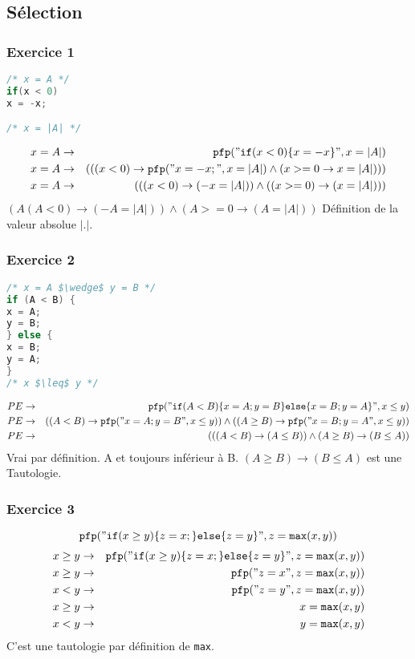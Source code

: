 \subsection{Sélection} \label{exoPfpSelect}
\subsubsection{Exercice 1}
\begin{lstlisting}[language=C]
/* x = A */
if(x < 0)
x = -x;

/* x = |A| */
\end{lstlisting}

\begin{eqnarray*}
x = A &\rightarrow& \texttt{pfp} ("\texttt{if}(x < 0)\{ x = -x \}", x = |A|)\\
x = A &\rightarrow& (((x<0)\rightarrow \texttt{pfp} ("x=-x;", x = |A| ) \wedge (x >= 0 \rightarrow x = |A|)))\\
x = A &\rightarrow& (((x < 0) \rightarrow (-x = |A|)) \wedge (( x >= 0) \rightarrow (x = |A|)))\\
\end{eqnarray*}
$( A ( A < 0) \rightarrow (-A = |A|) ) \wedge (A >= 0 \rightarrow (A=|A|))$
Définition de la valeur absolue $|.|$.

\subsubsection{Exercice 2}
\begin{lstlisting}[language=C]
/* x = A $\wedge$ y = B */
if (A < B) {
x = A;
y = B;
} else {
x = B;
y = A;
}
/* x $\leq$ y */ 
\end{lstlisting}
\begin{eqnarray*}
PE &\rightarrow& \texttt{pfp} ("\texttt{if} (A < B) \{ x = A; y = B\}\texttt{else} \{ x = B; y =A\}", x \leq y)\\
PE&\rightarrow&((A<B)\rightarrow\texttt{pfp}("x=A;y=B",x\leq y))\wedge((A\geq B)\rightarrow\texttt{pfp}("x=B;y=A",x\leq y))\\
PE &\rightarrow& ((( A < B) \rightarrow (A \leq B)) \wedge (A \geq B ) \rightarrow (B \leq A))
\end{eqnarray*}
Vrai par définition. A et toujours inférieur à B. $(A \geq B) \rightarrow (B \leq A)$ est une Tautologie. 
\subsubsection{Exercice 3}
$$\texttt{pfp} ("\texttt{if} (x \geq y )\{z=x;\}\texttt{else}\{z=y\}",z=\texttt{max}(x,y))$$
\begin{eqnarray*}
x \geq y  &\rightarrow&	\texttt{pfp} ("\texttt{if} (x \geq y )\{z=x;\}\texttt{else}\{z=y\}",z=\texttt{max}(x,y))\\
x \geq y &\rightarrow& \texttt{pfp} ("z = x", z = \texttt{max}(x,y))\\
x < y &\rightarrow& \texttt{pfp} ("z = y", z = \texttt{max}(x,y))\\
x \geq y &\rightarrow& x = \texttt{max}(x,y)\\
x < y &\rightarrow& y = \texttt{max}(x,y)
\end{eqnarray*}
C'est une tautologie par définition de \texttt{max}.

